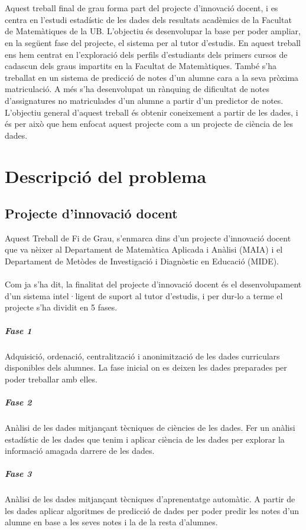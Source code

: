 \documentclass[12pt,a4paper,catalan]{article}
\begin{document}
\\
\\
Aquest treball final de grau forma part del projecte d'innovació docent, i es centra en l'estudi estadístic de les dades dels resultats acadèmics de la Facultat de Matemàtiques de la UB. L'objectiu és desenvolupar la base per poder ampliar, en la següent fase del projecte, el sistema per al tutor d'estudis. En aquest treball ens hem centrat en l'exploració dels perfils d'estudiants dels primers cursos de cadascun dels graus impartits en la Facultat de Matemàtiques. També s'ha treballat en un sistema de predicció de notes d'un alumne cara a la seva pròxima matriculació. A més s'ha desenvolupat un rànquing de dificultat de notes d'assignatures no matriculades d'un alumne a partir d'un predictor de notes. L'objectiu general d'aquest treball és obtenir coneixement a partir de les dades, i és per això que hem enfocat aquest projecte com a un projecte de ciència de les dades.


\newpage


\section{Descripció del problema}
\subsection{Projecte d'innovació docent}
Aquest Treball de Fi de Grau, s'enmarca dins d'un projecte d'innovació docent \cite{pid} que va nèixer al Departament de Matemàtica Aplicada i Anàlisi (MAIA) i el Departament de Metòdes de Investigació i Diagnòstic en Educació (MIDE).
\\
\\
Com ja s'ha dit, la finalitat del projecte d'innovació docent és el desenvolupament d'un sistema intel·ligent de suport al tutor d'estudis, i per dur-lo a terme el projecte s'ha dividit en 5 fases.

\subparagraph{Fase 1}
Adquisició, ordenació, centralització i anonimització de les dades curriculars disponibles dels alumnes. La fase inicial on es deixen les dades preparades per poder treballar amb elles.

\subparagraph{Fase 2}
Anàlisi de les dades mitjançant tècniques de ciències de les dades. Fer un anàlisi estadístic de les dades que tenim i aplicar ciència de les dades per explorar la informació amagada darrere de les dades.

\subparagraph{Fase 3}
Anàlisi de les dades mitjançant tècniques d’aprenentatge automàtic. A partir de les dades aplicar algoritmes de predicció de dades per poder predir les notes d'un alumne en base a les seves notes i la de la resta d'alumnes.
\end{document}
